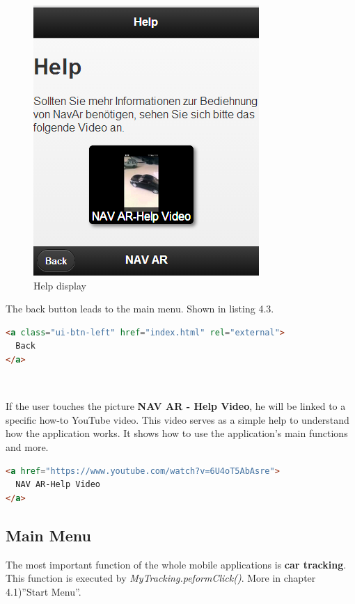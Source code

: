 \begin{figure}[h]
\centering
\includegraphics[width=0.5\linewidth]{graphics/chapter4/2}
\caption{Help display}
\end{figure}



\newpage
The back button leads to the main menu. Shown in listing 4.3.
\begin{lstlisting}[language=html, caption= 
Back button,captionpos=b]
<a class="ui-btn-left" href="index.html" rel="external">
  Back
</a>
\end{lstlisting}
\
\


If the user touches the picture \textbf{NAV AR - Help Video}, he will be linked to a specific how-to YouTube video. This video serves as a simple help to understand how the application works. It shows how to use the application's main functions and more.
\\

\begin{lstlisting}[language=html, caption= 
Help video,captionpos=b]
<a href="https://www.youtube.com/watch?v=6U4oT5AbAsre">
  NAV AR-Help Video
</a>
\end{lstlisting}



\subsection{Main Menu}
The most important function of the whole mobile applications is \textbf{car tracking}. This function is executed by \textit{MyTracking.peformClick()}. More in chapter 4.1)''Start Menu''.
\\

